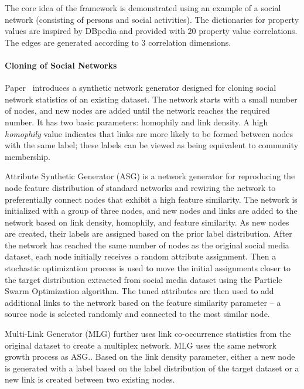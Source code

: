 The core idea of the framework is demonstrated using an example of a social
network (consisting of persons and social activities).  The dictionaries for
property values are inspired by DBpedia and provided with 20 property value
correlations. The edges are generated according to 3 correlation dimensions.


\paragraph{Cloning of Social Networks} Paper~\cite{Sukthankar-SocialInfo2014}
introduces a synthetic network generator designed for cloning social network
statistics of an existing dataset. The network starts with a small number of
nodes, and new nodes are added until the network reaches the required number. It
has two basic parameters: homophily and link density. A high \emph{homophily}
value indicates that links are more likely to be formed between nodes with the
same label; these labels can be viewed as being equivalent to community
membership.

Attribute Synthetic Generator (ASG) is a network generator for reproducing the
node feature distribution of standard networks and rewiring the network to
preferentially connect nodes that exhibit a high feature similarity. The network
is initialized with a group of three nodes, and new nodes and links are added to
the network based on link density, homophily, and feature similarity. As new
nodes are created, their labels are assigned based on the prior label
distribution. After the network has reached the same number of nodes as the
original social media dataset, each node initially receives a random attribute
assignment. Then a stochastic optimization process is used to move the initial
assignments closer to the target distribution extracted from social media
dataset using the Particle Swarm Optimization algorithm. The tuned attributes
are then used to add additional links to the network based on the feature
similarity parameter -- a source node is selected randomly and connected to the
most similar node.

Multi-Link Generator (MLG) further  uses link co-occurrence statistics from the
original dataset to create a multiplex network. MLG uses the same network growth
process as ASG.. Based on the link density parameter, either a new node is
generated with a label based on the label distribution of the target dataset or
a new link is created between two existing nodes.


